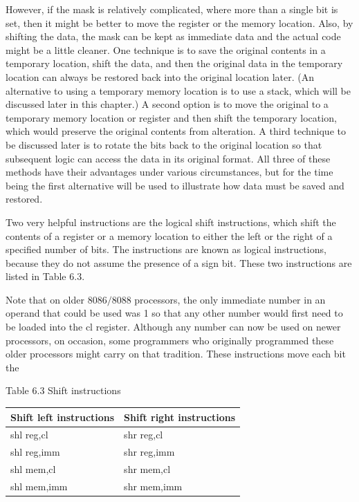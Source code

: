 \documentclass[10pt]{book}
\begin{document}
However, if the mask is relatively complicated, where more than a single bit is set, then it might be better to move the register or the memory location. Also, by shifting the data, the mask can be kept as immediate data and the actual code might be a little cleaner. One technique is to save the original contents in a temporary location, shift the data, and then the original data in the temporary location can always be restored back into the original location later. (An alternative to using a temporary memory location is to use a stack, which will be discussed later in this chapter.) A second option is to move the original to a temporary memory location or register and then shift the temporary location, which would preserve the original contents from alteration. A third technique to be discussed later is to rotate the bits back to the original location so that subsequent logic can access the data in its original format. All three of these methods have their advantages under various circumstances, but for the time being the first alternative will be used to illustrate how data must be saved and restored.

Two very helpful instructions are the logical shift instructions, which shift the contents of a register or a memory location to either the left or the right of a specified number of bits. The instructions are known as logical instructions, because they do not assume the presence of a sign bit. These two instructions are listed in Table 6.3.

Note that on older $8086 / 8088$ processors, the only immediate number in an operand that could be used was 1 so that any other number would first need to be loaded into the cl register. Although any number can now be used on newer processors, on occasion, some programmers who originally programmed these older processors might carry on that tradition. These instructions move each bit the

Table 6.3 Shift instructions

\begin{center}
\begin{tabular}{ll}
Shift left instructions & Shift right instructions \\
\hline
shl reg,cl & shr reg,cl \\
shl reg,imm & shr reg,imm \\
shl mem,cl & shr mem,cl \\
shl mem,imm & shr mem,imm \\
\end{tabular}
\end{center}
\end{document}
